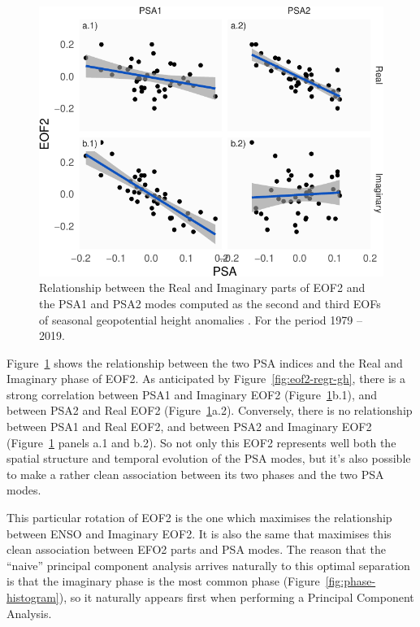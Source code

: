 \documentclass[smallextended]{svjour3}       %
\begin{document}
\begin{figure}
\centering
\includegraphics{../figures/psa-eof2-1.pdf}
\caption{\label{fig:psa-eof2}Relationship between the Real and Imaginary parts of EOF2 and the PSA1 and PSA2 modes computed as the second and third EOFs of seasonal geopotential height anomalies \citep{mo2001}. For the period 1979 -- 2019.}
\end{figure}

Figure~\ref{fig:psa-eof2} shows the relationship between the two PSA indices and the Real and Imaginary phase of EOF2. As anticipated by Figure~\ref{fig:eof2-regr-gh}, there is a strong correlation between PSA1 and Imaginary EOF2 (Figure~\ref{fig:psa-eof2}b.1), and between PSA2 and Real EOF2 (Figure~\ref{fig:psa-eof2}a.2). Conversely, there is no relationship between PSA1 and Real EOF2, and between PSA2 and Imaginary EOF2 (Figure~\ref{fig:psa-eof2} panels a.1 and b.2). So not only this EOF2 represents well both the spatial structure and temporal evolution of the PSA modes, but it's also possible to make a rather clean association between its two phases and the two PSA modes.

This particular rotation of EOF2 is the one which maximises the relationship between ENSO and Imaginary EOF2. It is also the same that maximises this clean association between EFO2 parts and PSA modes. The reason that the ``naive'' principal component analysis arrives naturally to this optimal separation is that the imaginary phase is the most common phase (Figure~\ref{fig:phase-histogram}), so it naturally appears first when performing a Principal Component Analysis.
\end{document}
